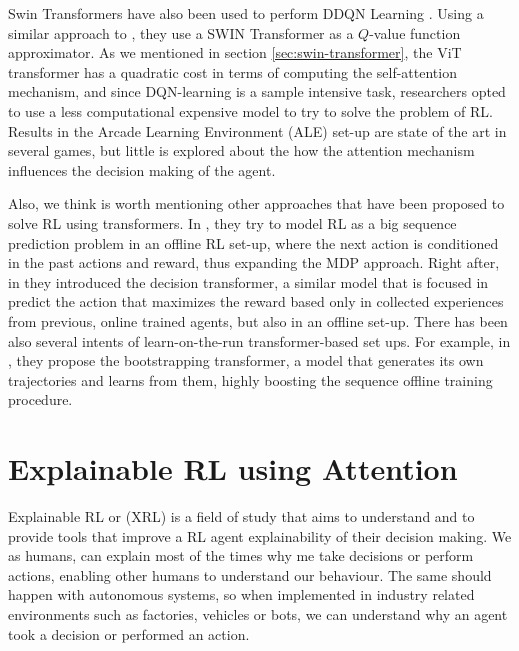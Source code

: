 Swin Transformers have also been used to perform DDQN Learning \cite{meng2024deep}. Using a similar approach to \cite{vanhasselt2015deep}, they use a SWIN Transformer as a $Q$-value function approximator. As we mentioned in section \ref{sec:swin-transformer}, the ViT transformer has a quadratic cost in terms of computing the self-attention mechanism, and since DQN-learning is a sample intensive task, researchers opted to use a less computational expensive model to try to solve the problem of RL. Results in the Arcade Learning Environment (ALE) \cite{Bellemare_2013} set-up are state of the art in several games, but little is explored about the how the attention mechanism influences the decision making of the agent.

Also, we think is worth mentioning other approaches that have been proposed to solve RL using transformers. In \cite{janner2021offline}, they try to model RL as a big sequence prediction problem in an offline RL set-up, where the next action is conditioned in the past actions and reward, thus expanding the MDP approach. Right after, in \cite{chen2021decision} they introduced the decision transformer, a similar model that is focused in predict the action that maximizes the reward based only in collected experiences from previous, online trained agents, but also in an offline set-up. There has been also several intents of learn-on-the-run transformer-based set ups. For example, in \cite{wang2022bootstrapped}, they propose the bootstrapping transformer, a model that generates its own trajectories and learns from them, highly boosting the sequence offline training procedure.

\section{Explainable RL using Attention}
Explainable RL or (XRL) is a field of study that aims to understand and to provide tools that improve a RL agent explainability of their decision making.
We as humans, can explain most of the times why me take decisions or perform actions, enabling other humans to understand our behaviour. The same should happen with autonomous systems, so when implemented in industry related environments such as factories, vehicles or bots, we can understand why an agent took a decision or performed an action.

